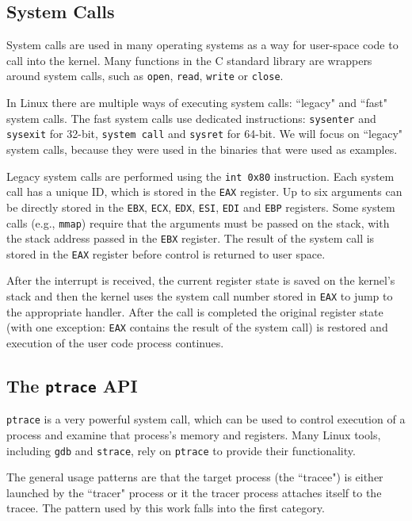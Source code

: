\documentclass{article}
\begin{document}
\subsection{System Calls}
\label{system calls}

System calls are used in many operating systems as a way for user-space code to call into the kernel. Many functions in the C standard library are wrappers around system calls, such as \texttt{open}, \texttt{read}, \texttt{write} or \texttt{close}.

In Linux there are multiple ways of executing system calls\cite[Chapter 10]{UnderstandingKernel}: ``legacy" and ``fast" system calls. The fast system calls use dedicated instructions: \texttt{sysenter} and \texttt{sysexit} for 32-bit, \texttt{system call} and \texttt{sysret} for 64-bit. We will focus on ``legacy" system calls, because they were used in the binaries that were used as examples.

Legacy system calls are performed using the \texttt{int 0x80} instruction. Each system call has a unique ID, which is stored in the \texttt{EAX} register. Up to six arguments can be directly stored in the \texttt{EBX}, \texttt{ECX}, \texttt{EDX}, \texttt{ESI}, \texttt{EDI} and \texttt{EBP} registers. Some system calls (e.g., \texttt{mmap}) require that the arguments must be passed on the stack, with the stack address passed in the \texttt{EBX} register. The result of the system call is stored in the \texttt{EAX} register before control is returned to user space.

After the interrupt is received, the current register state is saved on the kernel's stack and then the kernel uses the system call number stored in \texttt{EAX} to jump to the appropriate handler. After the call is completed the original register state (with one exception: \texttt{EAX} contains the result of the system call) is restored and execution of the user code process continues.

\subsection{The \texttt{ptrace} API}
\label{ptrace api}

\texttt{ptrace} is a very powerful system call, which can be used to control execution of a process and examine that process's memory and registers. Many Linux tools, including \texttt{gdb} and \texttt{strace}, rely on \texttt{ptrace} to provide their functionality.

The general usage patterns are that the target process (the ``tracee") is either launched by the ``tracer" process or it the tracer process attaches itself to the tracee. The pattern used by this work falls into the first category.
\end{document}
